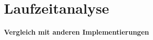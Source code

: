 \section{Laufzeitanalyse}
\label{laufzeitanalyse}

\paragraph{Vergleich mit anderen Implementierungen}
\label{vergleich_laufzeit}
